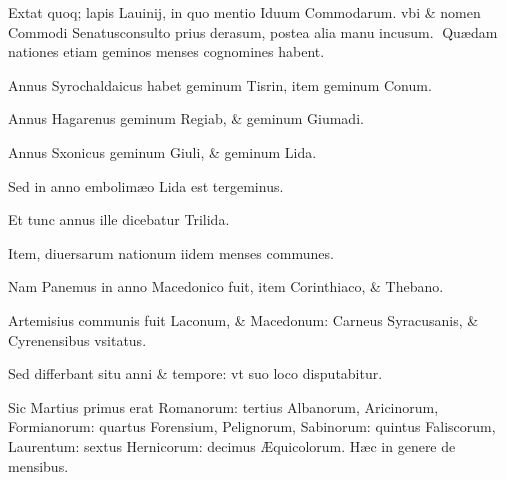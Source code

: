 \begin{parnumbers}

Extat quoq; lapis Lauinij, in quo mentio Iduum Commodarum. vbi \& nomen Commodi Senatusconsulto prius derasum, postea alia manu  incusum.
Quædam nationes etiam geminos menses cognomines habent.

Annus Syrochaldaicus habet geminum Tisrin, item geminum Conum.

Annus Hagarenus geminum Regiab, \& geminum Giumadi.

Annus Sxonicus geminum Giuli, \& geminum Lida.

Sed in anno embolimæo Lida est tergeminus.

Et tunc annus ille dicebatur Trilida.

Item, diuersarum nationum iidem menses communes.

Nam Panemus in anno Macedonico fuit, item Corinthiaco, \& Thebano.

Artemisius communis fuit Laconum, \& Macedonum: Carneus Syracusanis, \& Cyrenensibus vsitatus.

Sed differbant situ anni \& tempore: vt suo loco disputabitur.

Sic Martius primus erat  Romanorum: tertius Albanorum, Aricinorum, Formianorum: quartus Forensium, Pelignorum, Sabinorum: quintus Faliscorum, Laurentum: sextus Hernicorum: decimus Æquicolorum. Hæc in genere de mensibus.

\end{parnumbers}

